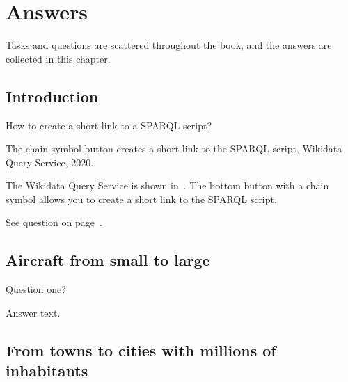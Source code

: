 \setchapterpreamble[u]{\margintoc}
\chapter{Answers}


Tasks and questions are scattered throughout the book, 
and the answers are collected in this chapter.


\section{Introduction}


\begin{exercise}%
    \label{answer:short-link-to-SPARQL}
How to create a short link to a SPARQL script?
\end{exercise}

\begin{marginfigure}[0cm]
    {%
        \setlength{\fboxsep}{0pt}
        \setlength{\fboxrule}{1pt}
    }
	\caption{The chain symbol button creates a short link to the SPARQL script, Wikidata Query Service, 2020.}
\end{marginfigure}

The Wikidata Query Service is shown in~. 
The bottom button with a chain symbol allows you to create a short link to the SPARQL script. 

See question on page~\pageref{question:short-link-to-SPARQL}.



\section{Aircraft from small to large}

\begin{exercise}%
    \label{answer:formulate-your-short-label-for-question-here-please}
Question one?
\end{exercise}

Answer text.



\section{From towns to cities with millions of inhabitants}

